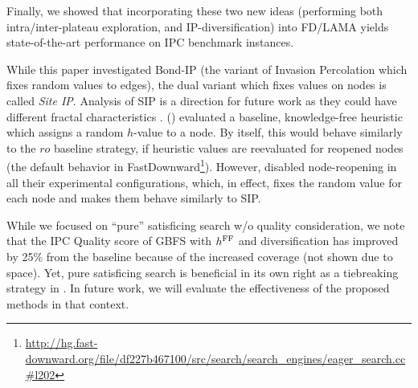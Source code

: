Finally, we showed that incorporating these two new ideas (performing both intra/inter-plateau exploration, and IP-diversification) into FD/LAMA yields state-of-the-art performance on IPC benchmark instances. 

While this paper investigated Bond-IP (the variant of Invasion Percolation which fixes random values to edges),
the dual variant which fixes values on nodes is called \emph{Site IP}.
Analysis of SIP is a direction for future work as they could have different fractal characteristics \cite{sheppard1999invasion}.
\citeauthor{valenzano2014comparison} (\citeyear[Section 4.3]{valenzano2014comparison}) evaluated a baseline, knowledge-free heuristic which assigns a random $h$-value to a node.
By itself, this would behave similarly to the $ro$ baseline strategy, if heuristic values are reevaluated for reopened nodes (the default behavior in FastDownward\footnote{\url{http://hg.fast-downward.org/file/df227b467100/src/search/search_engines/eager_search.cc\#l202}}).
However, \citeauthor{valenzano2014comparison} disabled node-reopening in all their experimental configurations, which, in effect, fixes the random value for each node and makes them behave similarly to SIP.


While we focused on ``pure'' satisficing search w/o quality consideration, we note that the IPC Quality score of GBFS with $\text{$h^\text{FF}$}$ and diversification has improved by 25\% from the baseline because of the increased coverage (not shown due to space). Yet, pure satisficing search is beneficial in its own right as a tiebreaking strategy in \astar \cite{Asai2017}. In future work, we will evaluate the effectiveness of the proposed methods in that context.


